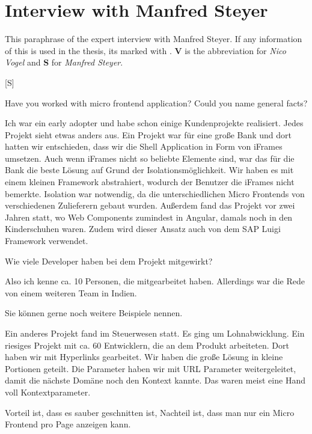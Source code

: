
\section{Interview with Manfred Steyer}

This paraphrase of the expert interview with Manfred Steyer.
If any information of this is used in the thesis, its marked with \cite{Vogel.2020.Steyer}.
\textbf{V} is the abbreviation for \textit{Nico Vogel} and \textbf{S} for \textit{Manfred Steyer}.

[S]

\begin{description}
    \NicoVogel Have you worked with micro frontend application? Could you name general facts?

    \ManfredSteyer Ich war ein early adopter und habe schon einige Kundenprojekte realisiert. Jedes Projekt sieht etwas anders aus. Ein Projekt war für eine große Bank und dort hatten wir entschieden, dass wir die Shell Application in Form von iFrames umsetzen. Auch wenn iFrames nicht so beliebte Elemente sind, war das für die Bank die beste Lösung auf Grund der Isolationsmöglichkeit. Wir haben es mit einem kleinen Framework abstrahiert, wodurch der Benutzer die iFrames nicht bemerkte. Isolation war notwendig, da die unterschiedlichen Micro Frontends von verschiedenen Zulieferern gebaut wurden. Außerdem fand das Projekt vor zwei Jahren statt, wo Web Components zumindest in Angular, damals noch in den Kinderschuhen waren. Zudem wird dieser Ansatz auch von dem SAP Luigi Framework verwendet.

    \NicoVogel Wie viele Developer haben bei dem Projekt mitgewirkt?

    \ManfredSteyer Also ich kenne ca. 10 Personen, die mitgearbeitet haben. Allerdings war die Rede von einem weiteren Team in Indien.

    \NicoVogel Sie können gerne noch weitere Beispiele nennen.

    \ManfredSteyer Ein anderes Projekt fand im Steuerwesen statt. Es ging um Lohnabwicklung. Ein riesiges Projekt mit ca. 60 Entwicklern, die an dem Produkt arbeiteten. Dort haben wir mit Hyperlinks gearbeitet. Wir haben die große Lösung in kleine Portionen geteilt. Die Parameter haben wir mit URL Parameter weitergeleitet, damit die nächste Domäne noch den Kontext kannte. Das waren meist eine Hand voll Kontextparameter.

    \NicoVogel Vorteil ist, dass es sauber geschnitten ist, Nachteil ist, dass man nur ein Micro Frontend pro Page anzeigen kann.


\end{description}
